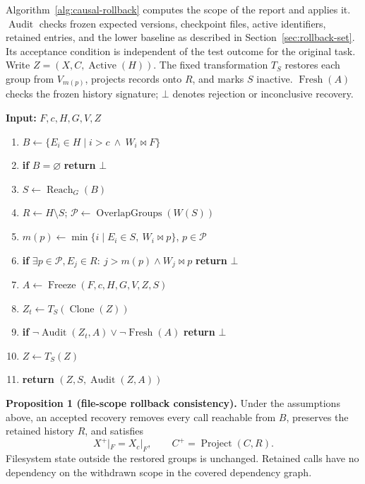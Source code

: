 Algorithm~\ref{alg:causal-rollback} computes the scope of the report and applies
it. $\operatorname{Audit}$ checks frozen expected versions, checkpoint
files, active identifiers, retained entries, and the lower baseline as
described in Section~\ref{sec:rollback-set}. Its acceptance condition is
independent of the test outcome for the original task.
Write $Z=(X,C,\operatorname{Active}(H))$. The fixed transformation $T_S$
restores each group from $V_{m(p)}$, projects records onto $R$, and marks
$S$ inactive. $\operatorname{Fresh}(A)$ checks the frozen history signature;
$\bot$ denotes rejection or inconclusive recovery.

\begin{algorithm}[H]
\caption{File-scoped recovery}
\label{alg:causal-rollback}
\footnotesize
\textbf{Input:} $F,c,H,G,V,Z$
\begin{enumerate}[label=\arabic*:,ref=\arabic*,leftmargin=1.7em,labelsep=.4em,topsep=2pt,itemsep=0pt,parsep=0pt]
\item $B\gets\{E_i\in H\mid i>c\ \land\ W_i\bowtie F\}$ \label{algline:file-roots}
\item \textbf{if} $B=\varnothing$ \textbf{return} $\bot$
\item $S\gets\operatorname{Reach}_G(B)$ \label{algline:closure-start}\label{algline:closure-end}
\item $R\gets H\setminus S$;
$\mathcal{P}\gets\operatorname{OverlapGroups}(W(S))$
\item $m(p)\gets\min\{i\mid E_i\in S,\ W_i\bowtie p\}$, $p\in\mathcal{P}$
\item \textbf{if} $\exists p\in\mathcal{P},E_j\in R:\ j>m(p)\land W_j\bowtie p$ \textbf{return} $\bot$ \label{algline:conflict}
\item $A\gets\operatorname{Freeze}(F,c,H,G,V,Z,S)$
\item $Z_t\gets T_S(\operatorname{Clone}(Z))$ \label{algline:restore}\label{algline:context}
\item \textbf{if} $\neg\operatorname{Audit}(Z_t,A)\lor\neg\operatorname{Fresh}(A)$ \textbf{return} $\bot$
\item $Z\gets T_S(Z)$
\item \textbf{return} $(Z,S,\operatorname{Audit}(Z,A))$
\end{enumerate}
\end{algorithm}

\textbf{Proposition 1 (file-scope rollback consistency).}
Under the assumptions above, an accepted recovery removes every call
reachable from $B$, preserves the retained history $R$, and satisfies
\[
  X^{+}|_F=X_c|_F,\qquad
  C^{+}=\operatorname{Project}(C,R).
\]
Filesystem state outside the restored groups is unchanged. Retained calls
have no dependency on the withdrawn scope in the covered dependency graph.

